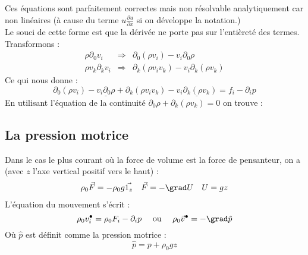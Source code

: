 Ces équations sont parfaitement correctes mais non résolvable analytiquement 
car non linéaires (à cause du terme $u\frac{\partial u}{\partial x}$ si on 
développe la notation.)\\
	
Le souci de cette forme est que la dérivée ne porte pas sur l'entièreté des 
termes. Transformons :
\begin{equation}
	\begin{array}{lll}
		\rho\partial_0 v_i     & \Rightarrow & \partial_0(\rho v_i) - v_i\partial_0\rho   \\
		\rho v_k\partial_k v_i & \Rightarrow & \partial_k(\rho v_iv_k)-v_i\partial_k(\rho 
		v_k)
	\end{array}
\end{equation}
Ce qui nous donne :
\begin{equation}
	\partial_0(\rho v_i) - \underline{v_i\partial_0\rho}+ \partial_k(\rho v_iv_k)-
	\underline{v_i\partial_k(\rho v_k)} = f_i-\partial_ip
\end{equation}
En utilisant l'équation de la continuité $\partial_0\rho + \partial_k(\rho v_k)
=0$ on trouve :\\
	
	
\subsection{La pression motrice}	
Dans le cas le plus courant où la force de volume est la force de pensanteur, on
a (avec $z$ l'axe vertical positif vers le haut) :
\begin{equation}
	\begin{array}{ccc}
		\rho_0\vec{F} = -\rho_0g\vec{1_z} & \vec{F} = -\grad U & U = gz 
	\end{array}
\end{equation}
L'équation du mouvement s'écrit :
\begin{equation}
	\rho_0v_i^\bullet = \rho_0F_i - \partial_i p\ \ \ \ \text{ou }\ \ \ \rho_0
	\vec{v}^\bullet = -\grad \hat{p}	
\end{equation}
Où $\hat{p}$ est définit comme la pression motrice :
\begin{equation}
	\hat{p} = p+\rho_0 gz
\end{equation}
	
